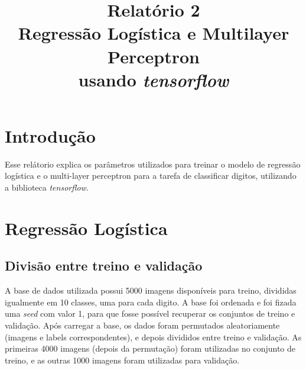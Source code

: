 \documentclass[conference]{IEEEtran}
\begin{document}
\title{%
  Relatório 2 \\
  \large Regressão Logística e Multilayer Perceptron \\
    usando \textit{tensorflow}}

\author{
}


\maketitle

\section{Introdução}
Esse relátorio explica os parâmetros utilizados para treinar o modelo de regressão logística e o multi-layer perceptron para a tarefa de classificar digitos, utilizando a biblioteca \textit{tensorflow}.

\section{Regressão Logística}

\subsection{Divisão entre treino e validação}
A base de dados utilizada possui 5000 imagens disponíveis para treino, divididas igualmente em 10 classes, uma para cada digito. A base foi ordenada e foi fizada uma \textit{seed} com valor 1, para que fosse possível recuperar os conjuntos de treino e validação. Após carregar a base, os dados foram permutados aleatoriamente (imagens e labels correspondentes), e depois divididos entre treino e validação. As primeiras 4000 imagens (depois da permutação) foram utilizadas no conjunto de treino, e as outras 1000 imagens foram utilizadas para validação.
\end{document}
